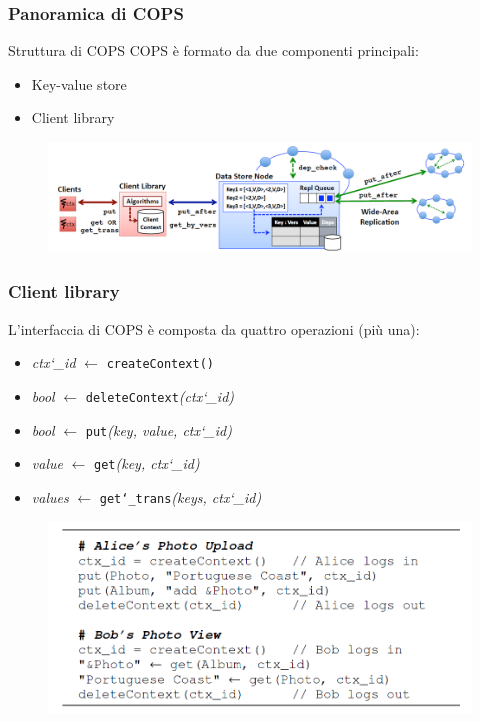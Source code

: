 \begin{frame}
\frametitle{Panoramica di COPS}
\begin{block}{Struttura di COPS}
COPS è formato da due componenti principali:
\begin{itemize}
	\item<1-> Key-value store
	\item<1-> Client library
\end{itemize}
\end{block}
\begin{figure}
	\centering
	\includegraphics[scale=0.35]{COPS/COPS7.png}
\end{figure}
\end{frame}

\begin{frame}
\frametitle{Client library}
L'interfaccia di COPS è composta da quattro operazioni (più una):
\begin{itemize}
	\item<1-> \textit{ctx\char`_id} $\leftarrow$ \texttt{createContext()}
	\item<1-> \textit{bool} $\leftarrow$ \texttt{deleteContext}\textit{(ctx\char`_id)}
	\item<1-> \textit{bool} $\leftarrow$ \texttt{put}\textit{(key, value, ctx\char`_id)}
	\item<1-> \textit{value} $\leftarrow$ \texttt{get}\textit{(key, ctx\char`_id)}
	\item<1-> \textit{values} $\leftarrow$ \texttt{get\char`_trans}\textit{(keys, ctx\char`_id)}
\end{itemize}
\begin{figure}
	\centering
	\includegraphics[scale=0.35]{COPS/COPS3.png}
\end{figure}
\end{frame}

